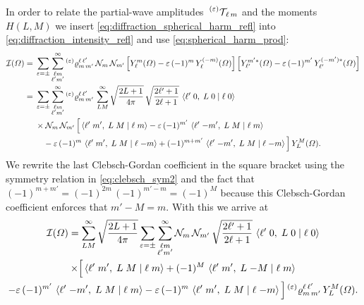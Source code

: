In order to relate the partial-wave
amplitudes~$\prescript{(\ensuremath{\varepsilon})}{}{\ensuremath{\mathcal{T}}}_{\!\ell\, m}$ and the
moments~$H(L, M)$ we insert \cref{eq:diffraction_spherical_harm_refl}
into \cref{eq:diffraction_intensity_refl} and use
\cref{eq:spherical_harm_prod}:
\begin{align}
  \intensity(\Omega)
  ={}&
    \sum_{\refl = \pm} \sum_{\substack{\ell m \\ \ell' m'}}^\infty
    \prescript{(\refl)}{}{\varrho}^{\ell\, \ell'}_{m\, m'}\,
    \mathcal{N}_m\, \mathcal{N}_{m'}
    \sBrk[2]{Y_\ell^m(\Omega) - \refl\, (-1)^m\, Y_\ell^{(-m)}(\Omega)}
    \sBrk[2]{Y_{\ell'}^{m' *}(\Omega) - \refl\, (-1)^{m'}\, Y_{\ell'}^{(-m') *}(\Omega)}
  \\
  ={}& \begin{multlined}[t][0.85\columnwidth]
    \sum_{\refl = \pm} \sum_{\substack{\ell m \\ \ell' m'}}^\infty
    \prescript{(\refl)}{}{\varrho}^{\ell\, \ell'}_{m\, m'}\,
    \sum_{L M}^\infty \sqrt{\frac{2 L + 1}{4 \pi}}\, \sqrt{\frac{2 \ell' + 1}{2 \ell + 1}}\, \clebsch{\ell'}{0}{L}{0}{\ell}{0}
    \\
    \shoveleft{\times \mathcal{N}_m\, \mathcal{N}_{m'}\, \Big[ \clebsch{\ell'}{m'}{L}{M}{\ell}{m}
      - \refl\, (-1)^{m'}\, \clebsch{\ell'}{-m'}{L}{M}{\ell}{m}}
    \\
    - \refl\, (-1)^m\, \clebsch{\ell'}{m'}{L}{M}{\ell}{-m} + (-1)^{m + m'}\, \clebsch{\ell'}{-m'}{L}{M}{\ell}{-m} \Big]\,
    Y_L^M(\Omega).
  \end{multlined}
\end{align}
We rewrite the last Clebsch-Gordan coefficient in the square bracket
using the symmetry relation in \cref{eq:clebsch_sym2} and the fact
that $(-1)^{m + m'} = (-1)^{2m}\, (-1)^{m' - m} = (-1)^M$ because this
Clebsch-Gordan coefficient enforces that $m' - M = m$.  With this we
arrive at
\begin{multline}
  \mathcal{I}(\Omega)
  = \sum_{L M}^\infty \sqrt{\frac{2 L + 1}{4 \pi}}
  \sum_{\varepsilon = \pm} \sum_{\substack{\ell m \\ \ell' m'}}^\infty
  \mathcal{N}_m\, \mathcal{N}_{m'}\,
  \sqrt{\frac{2 \ell' + 1}{2 \ell + 1}}\,
  \braket{{\ell'}\;{0},\;{L}\;{0}\; |\; {\ell}\;{0}}
  \\
  \times \Big[
    \braket{{\ell'}\;{m'},\;{L}\;{M}\; |\; {\ell}\;{m}}
    + (-1)^M\, \braket{{\ell'}\;{m'},\;{L}\;{-M}\; |\; {\ell}\;{m}}
    \\
    - \varepsilon\, (-1)^{m'}\, \braket{{\ell'}\;{-m'},\;{L}\;{M}\; |\; {\ell}\;{m}}
    - \varepsilon\, (-1)^m\, \braket{{\ell'}\;{m'},\;{L}\;{M}\; |\; {\ell}\;{-m}} \Big]
  \prescript{(\ensuremath{\varepsilon})}{}{\varrho}^{\ell\, \ell'}_{m\, m'}\,
  Y_L^M(\Omega).
\end{multline}
